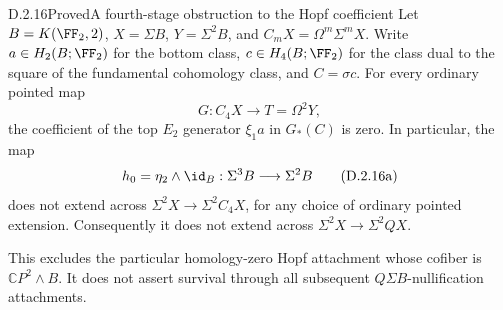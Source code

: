 \begin{claim}{D.2.16}{Proved}{A fourth-stage obstruction to the Hopf coefficient}
Let $B=K(\FF_2,2)$, $X=\Sigma B$, $Y=\Sigma^2B$, and
$C_mX=\Omega^m\Sigma^mX$. Write $a\in H_2(B;\FF_2)$ for
the bottom class, $c\in H_4(B;\FF_2)$ for the class dual to
the square of the fundamental cohomology class, and $C=\sigma c$.
For every ordinary pointed map
\[
 G:C_4X\longrightarrow T=\Omega^2Y,
\]
the coefficient of the top $E_2$ generator $\xi_1a$ in
$G_*(C)$ is zero. In particular, the map
\[
 h_0=\eta_2\wedge\id_B:\Sigma^3B\longrightarrow\Sigma^2B
 \tag{D.2.16a}
\]
does not extend across
$\Sigma^2X\to\Sigma^2C_4X$, for any choice of ordinary pointed
extension. Consequently it does not extend across
$\Sigma^2X\to\Sigma^2QX$.

This excludes the particular homology-zero Hopf attachment whose
cofiber is $\mathbb CP^2\wedge B$. It does not assert survival
through all subsequent $Q\Sigma B$-nullification attachments.
\end{claim}
